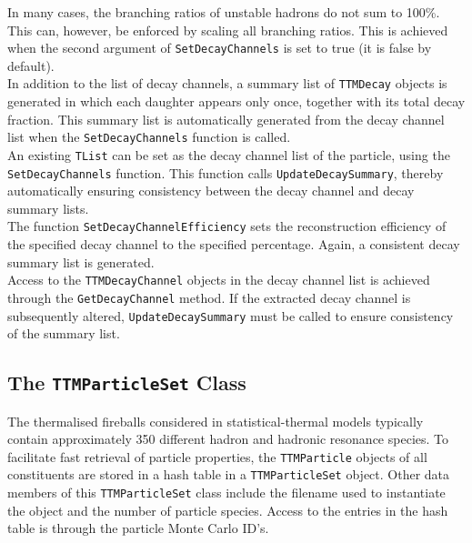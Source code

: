 \documentclass{elsarticle}
\begin{document}
In many cases, the branching 
ratios of unstable hadrons do not sum to 100\%. This can, however, be enforced by 
scaling all branching ratios. This is achieved when the second argument of 
\texttt{SetDecayChannels} is set to true (it is false by default).\\

In addition to the list of decay channels, a summary list of 
\texttt{TTMDecay} objects is generated in which each daughter 
appears only once, together with its total
decay fraction. This summary list is automatically generated from the
decay channel list when the \texttt{SetDecayChannels} function is called.\\
 
An existing \texttt{TList} can be set as the decay channel list of the particle, 
using the \texttt{SetDecayChannels} function. This function calls
\texttt{UpdateDecaySummary}, thereby automatically ensuring consistency between
the decay channel and decay summary lists.\\

The function \texttt{SetDecayChannelEfficiency} sets 
the reconstruction efficiency of the specified
decay channel to the specified percentage. Again, a consistent decay summary list 
is generated.\\
 
Access to the \texttt{TTMDecayChannel} objects in the decay channel list is achieved 
through the \texttt{GetDecayChannel} method. If the extracted decay channel 
is subsequently altered, \texttt{UpdateDecaySummary} must be called to
ensure consistency of the summary list.\\

\subsection{The \texttt{TTMParticleSet} Class}

The thermalised fireballs considered in statistical-thermal models typically contain 
approximately 350 different hadron and hadronic resonance species. To facilitate fast 
retrieval of particle properties, the \texttt{TTMParticle} objects of all constituents 
are stored in a hash table 
in a \texttt{TTMParticleSet} object. Other data members of this \texttt{TTMParticleSet} class 
include the filename used to instantiate the object and the number of particle species. 
Access to the entries in the hash table is through the particle Monte Carlo ID's.\\ 
\end{document}
